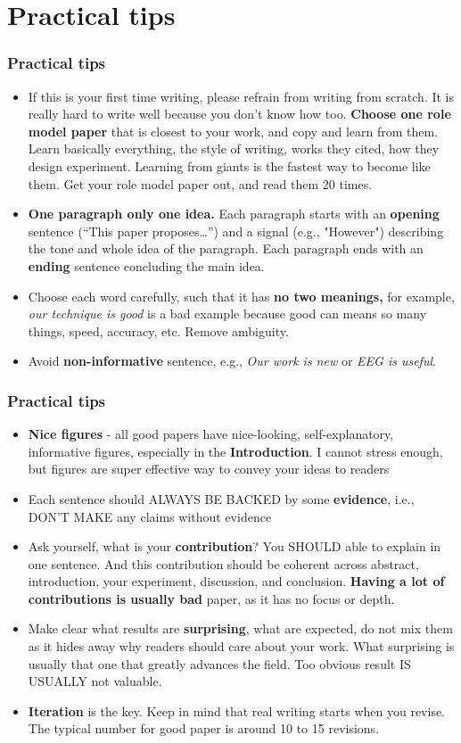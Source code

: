 \documentclass{beamer}
\begin{document}
\section{Practical tips}

\begin{frame}
\frametitle{Practical tips}
\footnotesize
\begin{itemize}
	\item If this is your first time writing, please refrain from writing from scratch. It is really hard to write well because you don't know how too. \textbf{Choose one role model paper} that is closest to your work, and copy and learn from them. Learn basically everything, the style of writing,  works they cited, how they design experiment. Learning from giants is the fastest way to become like them. Get your role model paper out, and read them 20 times.
	\item \textbf{One paragraph only one idea.}   Each paragraph starts with an \textbf{opening} sentence (“This paper proposes…”) and a signal (e.g., "However") describing the tone and whole idea of the paragraph.   Each paragraph ends with an \textbf{ending} sentence concluding the main idea.
	\item Choose each word carefully, such that it has \textbf{no two meanings, }for example, \textit{our technique is good} is a bad example because good can means so many things, speed, accuracy, etc.  Remove ambiguity.
	\item Avoid \textbf{non-informative }sentence, e.g., \textit{Our work is new} or \textit{EEG is useful}.
\end{itemize}
\end{frame}

\begin{frame}
\frametitle{Practical tips}
\footnotesize
\begin{itemize}
	\item \textbf{Nice figures} - all good papers have nice-looking, self-explanatory, informative figures, especially in the \textbf{Introduction}.  I cannot stress enough, but figures are super effective way to convey your ideas to readers
	\item Each sentence should ALWAYS BE BACKED by some \textbf{evidence}, i.e., DON’T MAKE any claims without evidence
	\item Ask yourself, what is your \textbf{contribution}?  You SHOULD able to explain in one sentence.  And this contribution should be coherent across abstract, introduction, your experiment, discussion, and conclusion.  \textbf{Having a lot of contributions is usually bad} paper, as it has no focus or depth.
	\item Make clear what results are \textbf{surprising}, what are expected, do not mix them as it hides away why readers should care about your work.  What surprising is usually that one that greatly advances the field.  Too obvious result IS USUALLY not valuable. 
	\item \textbf{Iteration} is the key.  Keep in mind that real writing starts when you revise.  The typical number for good paper is around 10 to 15 revisions.

\end{itemize}
\end{frame}
\end{document}
